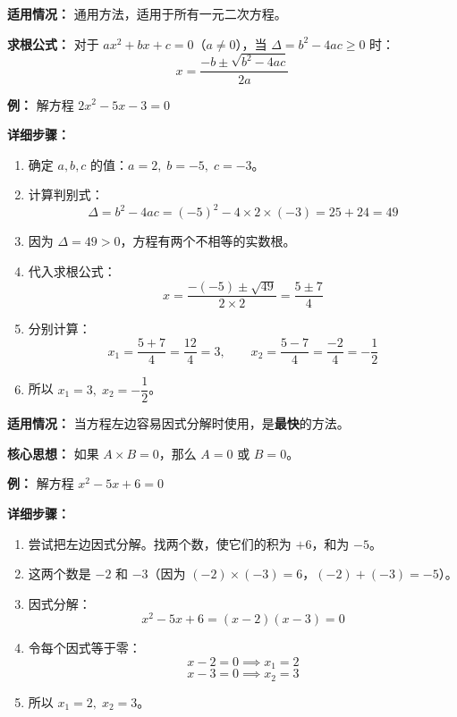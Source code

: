 \documentclass[12pt, a4paper]{ctexart}
\begin{document}
\begin{knowledgebox}
\textbf{适用情况：} 通用方法，适用于所有一元二次方程。

\textbf{求根公式：} 对于 $ax^2 + bx + c = 0$（$a \neq 0$），当 $\Delta = b^2 - 4ac \geq 0$ 时：
\[
\boxed{x = \frac{-b \pm \sqrt{b^2 - 4ac}}{2a}}
\]

\textbf{例：} 解方程 $2x^2 - 5x - 3 = 0$

\textbf{详细步骤：}
\begin{enumerate}[leftmargin=2em]
  \item 确定 $a, b, c$ 的值：$a = 2,\; b = -5,\; c = -3$。
  \item 计算判别式：
  \[
  \Delta = b^2 - 4ac = (-5)^2 - 4 \times 2 \times (-3) = 25 + 24 = 49
  \]
  \item 因为 $\Delta = 49 > 0$，方程有两个不相等的实数根。
  \item 代入求根公式：
  \[
  x = \frac{-(-5) \pm \sqrt{49}}{2 \times 2} = \frac{5 \pm 7}{4}
  \]
  \item 分别计算：
  \[
  x_1 = \frac{5 + 7}{4} = \frac{12}{4} = 3, \qquad x_2 = \frac{5 - 7}{4} = \frac{-2}{4} = -\frac{1}{2}
  \]
  \item 所以 $x_1 = 3,\; x_2 = -\dfrac{1}{2}$。
\end{enumerate}
\end{knowledgebox}

\begin{knowledgebox}
\textbf{适用情况：} 当方程左边容易因式分解时使用，是\textbf{最快}的方法。

\textbf{核心思想：} 如果 $A \times B = 0$，那么 $A = 0$ 或 $B = 0$。

\textbf{例：} 解方程 $x^2 - 5x + 6 = 0$

\textbf{详细步骤：}
\begin{enumerate}[leftmargin=2em]
  \item 尝试把左边因式分解。找两个数，使它们的积为 $+6$，和为 $-5$。
  \item 这两个数是 $-2$ 和 $-3$（因为 $(-2) \times (-3) = 6$，$(-2) + (-3) = -5$）。
  \item 因式分解：
  \[
  x^2 - 5x + 6 = (x - 2)(x - 3) = 0
  \]
  \item 令每个因式等于零：
  \[
  x - 2 = 0 \implies x_1 = 2
  \]
  \[
  x - 3 = 0 \implies x_2 = 3
  \]
  \item 所以 $x_1 = 2,\; x_2 = 3$。
\end{enumerate}
\end{knowledgebox}
\end{document}

